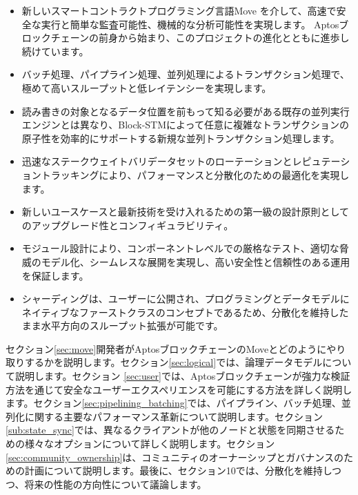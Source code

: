 \documentclass{article}
\begin{document}
\begin{itemize}
 \item 新しいスマートコントラクトプログラミング言語Move \cite{move}を介して、高速で安全な実行と簡単な監査可能性、機械的な分析可能性を実現します。 Aptosブロックチェーンの前身から始まり、このプロジェクトの進化とともに進歩し続けています。
 
 \item バッチ処理、パイプライン処理、並列処理によるトランザクション処理で、極めて高いスループットと低レイテンシーを実現します。
 
 \item 読み書きの対象となるデータ位置を前もって知る必要がある既存の並列実行エンジンとは異なり、Block-STMによって任意に複雑なトランザクションの原子性を効率的にサポートする新規な並列トランザクション処理します。
 
 \item 迅速なステークウェイトバリデータセットのローテーションとレピュテーショントラッキングにより、パフォーマンスと分散化のための最適化を実現します。
 
 \item 新しいユースケースと最新技術を受け入れるための第一級の設計原則としてのアップグレード性とコンフィギュラビリティ。
 
 \item モジュール設計により、コンポーネントレベルでの厳格なテスト、適切な脅威のモデル化、シームレスな展開を実現し、高い安全性と信頼性のある運用を保証します。
 
 \item シャーディングは、ユーザーに公開され、プログラミングとデータモデルにネイティブなファーストクラスのコンセプトであるため、分散化を維持したまま水平方向のスループット拡張が可能です。
 
\end{itemize}
セクション\ref{sec:move}開発者がAptosブロックチェーンのMoveとどのようにやり取りするかを説明します。セクション\ref{sec:logical}では、論理データモデルについて説明します。セクション \ref{sec:user}では、Aptosブロックチェーンが強力な検証方法を通じて安全なユーザーエクスペリエンスを可能にする方法を詳しく説明します。セクション\ref{sec:pipelining_batching}では、パイプライン、バッチ処理、並列化に関する主要なパフォーマンス革新について説明します。セクション\ref{sub:state_sync}では、異なるクライアントが他のノードと状態を同期させるための様々なオプションについて詳しく説明します。セクション\ref{sec:community_ownership}は、コミュニティのオーナーシップとガバナンスのための計画について説明します。最後に、セクション10では、分散化を維持しつつ、将来の性能の方向性について議論します。
\end{document}
